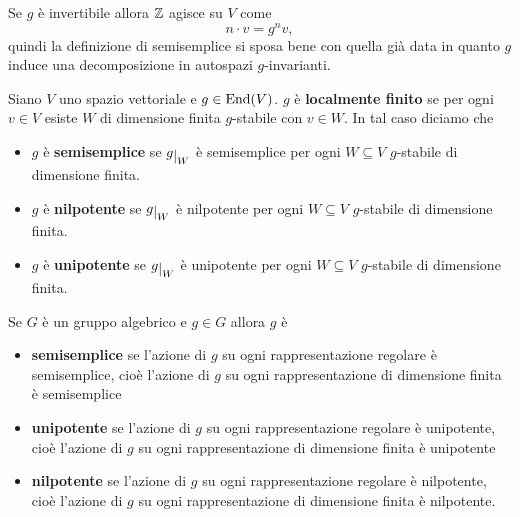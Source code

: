 \begin{remark}
Se $g$ \`e invertibile allora $\mathbb{Z}$ agisce su $V$ come
\[n\cdot v=g^nv,\]
quindi la definizione di semisemplice si sposa bene con quella gi\`a data in quanto $g$ induce una decomposizione in autospazi $g$-invarianti.
\end{remark}

\begin{definition}
Siano $V$ uno spazio vettoriale e $g\in \operatorname{End}(V)$. $g$ \`e \textbf{localmente finito} se per ogni $v\in V$ esiste $W$ di dimensione finita $g$-stabile con $v\in W$. In tal caso diciamo che
\begin{itemize}
    \item $g$ \`e \textbf{semisemplice} se $g\res W$ \`e semisemplice per ogni $W\subseteq V$ $g$-stabile di dimensione finita.
    \item $g$ \`e \textbf{nilpotente} se $g\res W$ \`e nilpotente per ogni $W\subseteq V$ $g$-stabile di dimensione finita.
    \item $g$ \`e \textbf{unipotente} se $g\res W$ \`e unipotente per ogni $W\subseteq V$ $g$-stabile di dimensione finita.
\end{itemize}
\end{definition}

\begin{definition}
Se $G$ \`e un gruppo algebrico e $g\in G$ allora $g$ \`e
\begin{itemize}
    \item \textbf{semisemplice} se l'azione di $g$ su ogni rappresentazione regolare \`e semisemplice, cio\`e l'azione di $g$ su ogni rappresentazione di dimensione finita \`e semisemplice
    \item \textbf{unipotente} se l'azione di $g$ su ogni rappresentazione regolare \`e unipotente, cio\`e l'azione di $g$ su ogni rappresentazione di dimensione finita \`e unipotente
    \item \textbf{nilpotente} se l'azione di $g$ su ogni rappresentazione regolare \`e nilpotente, cio\`e l'azione di $g$ su ogni rappresentazione di dimensione finita \`e nilpotente.
\end{itemize}
\end{definition}



